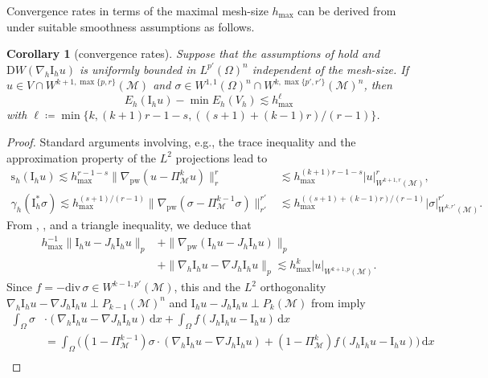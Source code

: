 \documentclass[a4paper]{amsart}
\numberwithin{equation}{section}
\renewcommand{\d}[1]{\,\mathrm{d}#1}
\renewcommand{\div}{\mathrm{div}}
\newcommand{\I}{\mathrm{I}}
\newcommand{\Mcal}{\mathcal{M}}
\newcommand{\pw}{\mathrm{pw}}
\newcommand{\D}{\mathrm{D}}
\newcommand{\s}{\mathrm{s}}
\newtheorem{corollary}[theorem]{Corollary}
\theoremstyle{remark}
\begin{document}
Convergence rates in terms of the maximal mesh-size $h_{\max}$ can be derived from  under suitable smoothness assumptions as follows.

\begin{corollary}[convergence rates]\label{cor:convergence-rates}
Suppose that the assumptions of  hold and $\D W(\nabla_h \mathrm{I}_h u)$ is uniformly bounded in $L^{p'}(\Omega)^n$ independent of the mesh-size.
	If $u \in V \cap W^{k+1,\max\{p,r\}}(\Mcal)$ and $\sigma \in W^{1,1}(\Omega)^n \cap W^{k,\max\{p',r'\}}(\Mcal)^n$, then $$E_h(\I_h u) - \min E_h(V_h) \lesssim h_{\max}^{\ell}$$
	with $\ell \coloneqq \min\{k, (k+1)r-1-s, ((s+1)+(k-1)r)/(r-1)\}$.
\end{corollary}

\begin{proof}
Standard arguments involving, e.g., the trace inequality and the approximation property of the $L^2$ projections lead to
	\begin{align}\label{ineq:proof-stab-conv}
		\s_h(\mathrm{I}_h u) \lesssim h_\mathrm{max}^{r-1-s}\|\nabla_\pw(u - \Pi_{\Mcal}^k u)\|_r^r &\lesssim h_\mathrm{max}^{(k+1)r-1-s}|u|_{W^{k+1,r}(\Mcal)}^r,\\
		\gamma_h(\mathrm{I}_h^* \sigma) \lesssim h_{\max}^{(s+1)/(r-1)}\|\nabla_\pw(\sigma - \Pi_{\Mcal}^{k-1}\sigma)\|^{r'}_{r'} &\lesssim h_{\max}^{((s+1)+(k-1)r)/(r-1)}|\sigma|_{W^{k,r'}(\Mcal)}^{r'}.\nonumber
	\end{align}
	From , , and a triangle inequality, we deduce that
	\begin{align*}
		h_\mathrm{max}^{-1}\|\mathrm{I}_h u - J_h \mathrm{I}_h u\|_{p} &+ \|\nabla_\pw (\mathrm{I}_h u - J_h \mathrm{I}_h u)\|_{p}\\
		& + \|\nabla_h \I_h u - \nabla J_h \I_h u\|_{p} \lesssim h^k_\mathrm{max}|u|_{W^{k+1,p}(\Mcal)}.
	\end{align*}
	Since $f = -\div\,\sigma \in W^{k-1,p'}(\Mcal)$, this and the $L^2$ orthogonality $\nabla_h \I_h u - \nabla J_h \I_h u \perp P_{k-1}(\Mcal)^n$ and $\I_h u - J_h \mathrm{I}_h u \perp P_{k}(\Mcal)$ from  imply
	\begin{align}\label{ineq:proof-conv}
		\int_\Omega \sigma &\cdot (\nabla_h \I_h u - \nabla J_h \I_h u) \d{x} + \int_\Omega f (J_h \I_h u - \mathrm{I}_h u) \d{x}\nonumber\\
		&= \int_\Omega \big((1 - \Pi_\Mcal^{k-1}) \sigma \cdot (\nabla_h \I_h u - \nabla J_h \I_h u) + (1 - \Pi_\Mcal^k) f (J_h \I_h u - \mathrm{I}_h u)\big) \d{x}\nonumber\\

\end{align}
\end{proof}
\end{document}
